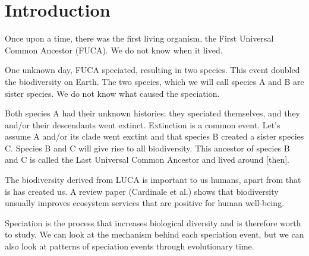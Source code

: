 \chapter{Introduction}
\label{chapter_introduction}
\newpage

\noindent

Once upon a time, there was the first living organism, the 
First Universal Common Ancestor (FUCA).
We do not know when it lived.

% 
%

One unknown day, FUCA speciated, resulting in two species.
This event doubled the biodiversity on Earth.
The two species, which we will call species A and B
are sister species.
We do not know what caused the speciation.

%

Both species A had their unknown histories: they speciated themselves,
and they and/or their descendants went extinct. 
Extinction is a common event. Let's assume A and/or its clade went
exctint and that species B created a sister species C. Species B
and C will give rise to all biodiversity. This ancestor of species B and C 
is called the Last Universal Common Ancestor and lived around [then].

            
%

The biodiversity derived from LUCA is important to us humans, apart from
that is has created us. A review paper (Cardinale et al.) shows that 
biodiversity unsually improves ecosystem services that are 
positive for human well-being.

%
%
%
%

Speciation is the process that increases biological diversity 
and is therefore worth to study.
We can look at the mechanism behind each speciation event,
but we can also look at patterns 
of speciation events through evolutionary time.

%
%

